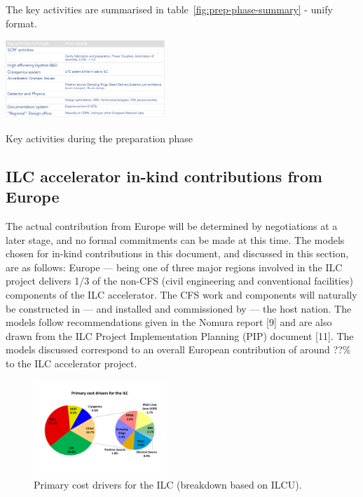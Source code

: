 \documentclass[%
 reprint,
 amsmath,amssymb,
 aps,
]{revtex4-1}
\begin{document}
The key activities are summarised in table~\ref{fig:prep-phase-summary} - unify format.


\begin{table}[htbp]
\includegraphics[width=0.45\textwidth]{figures/prep-phase-summary.pdf}
\caption{\label{fig:prep-phase-summary} Key activities during the preparation phase}
\end{table}


\subsection{ILC accelerator in-kind contributions from Europe ~\label{sec:constrphase:accelerator}}

The actual contribution from Europe will be determined by negotiations at a later stage, and no formal commitments can be made at this time. The models chosen for in-kind contributions in this document, and discussed in this section, are as follows: Europe — being one of three major regions involved in the ILC project delivers 1/3 of  the  non-CFS  (civil  engineering  and  conventional  facilities) components  of  the  ILC  accelerator.   The  CFS  work  and  components  will  naturally  be constructed in — and installed and commissioned by — the host nation.   The models follow recommendations given in the Nomura report [9] and are also drawn from the ILC Project Implementation Planning (PIP) document [11]. The models discussed correspond to an overall European contribution of around ??\% to the ILC accelerator project. 

\begin{figure}[htbp]
\begin{center}
\includegraphics[width=0.45\textwidth]{figures/eap-chp3-ilccostdrivers.pdf}
 \caption{\label{fig:constructionmodel:ILCPrimaryCostDrivers} Primary cost drivers for the ILC (breakdown based on ILCU).}
\end{center}
\end{figure}
\end{document}
